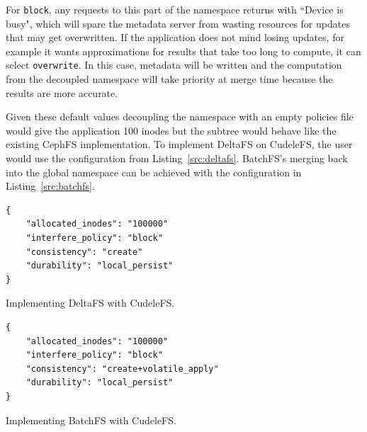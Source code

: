For \texttt{block}, any requests to this part of the namespace returns with
``Device is busy", which will spare the metadata server from wasting resources
for updates that may get overwritten. If the application does not mind losing
updates, for example it wants approximations for results that take too long to
compute, it can select \texttt{overwrite}. In this case, metadata will be
written and the computation from the decoupled namespace will take priority at
merge time because the results are more accurate.

Given these default values decoupling the namespace with an empty policies file
would give the application 100 inodes but the subtree would behave like the
existing CephFS implementation. To implement DeltaFS on CudeleFS, the user
would use the configuration from Listing~\ref{src:deltafs}. BatchFS's merging
back into the global namespace can be achieved with the configuration in
Listing~\ref{src:batchfs}.

\begin{listing}
\begin{verbatim}
{     
    "allocated_inodes": "100000"
    "interfere_policy": "block"
    "consistency": "create"
    "durability": "local_persist"
}
\end{verbatim}
\caption{Implementing DeltaFS with CudeleFS.}
\label{src:deltafs}
\end{listing}

\begin{listing}
\begin{verbatim}
{     
    "allocated_inodes": "100000"
    "interfere_policy": "block"
    "consistency": "create+volatile_apply"
    "durability": "local_persist"
}
\end{verbatim}
\caption{Implementing BatchFS with CudeleFS.}
\label{src:batchfs}
\end{listing}

